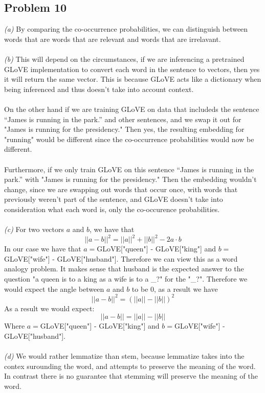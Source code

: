 \documentclass[11pt]{article}
\begin{document}
\begin{multicols}{2}
\subsection*{Problem 10}
\textit{(a)} By comparing the co-occurrence probabilities, we can distinguish between words that are words that are relevant and words that are irrelavant.\\\\
\textit{(b)} This will depend on the circumstances, if we are inferencing a pretrained GLoVE implementation to convert each word in the sentence to vectors, then yes it will return the same vector. This is because GLoVE acts like a dictionary when being inferenced and thus doesn't take into account context.\\\\
On the other hand if we are training GLoVE on data that includeds the sentence “James is running in the park.” and other sentences, and we swap it out for "James is running for the
presidency." Then yes, the resulting embedding for "running" would be different since the co-occurrence probabilities would now be different.\\\\
Furthermore, if we only train GLoVE on this sentence “James is running in the park.” with "James is running for the
presidency." Then the embedding wouldn't change, since we are swapping out words that occur once, with words that previously weren't part of the sentence, and GLoVE doesn't take into consideration what each word is, only
the co-occurence probabilities.\\\\
\textit{(c)} For two vectors $a$ and $b$, we have that
$$||a-b||^2=||a||^2+||b||^2-2a\cdot b$$
In our case we have that $a=$GLoVE["queen"] - GLoVE["king"] and $b=$GLoVE["wife"] - GLoVE["husband"]. Therefore we can view this as a word analogy problem. It makes sense that husband is the expected answer to the question "a queen is to a king as a wife is to a \_?" for the "\_?". Therefore we would expect the angle between $a$ and $b$ to be 0, as a result we have
$$||a-b||^2=(||a||-||b||)^2$$
As a result we would expect:
$$||a-b||=||a||-||b||$$
Where $a=$GLoVE["queen"] - GLoVE["king"] and $b=$GLoVE["wife"] - GLoVE["husband"].\\\\
\textit{(d)}
We would rather lemmatize than stem, because lemmatize takes into the contex surounding the word, and attempts to preserve the meaning of the word. In contrast there is no guarantee that stemming will preserve the meaning of the word.

\end{multicols}
\end{document}
